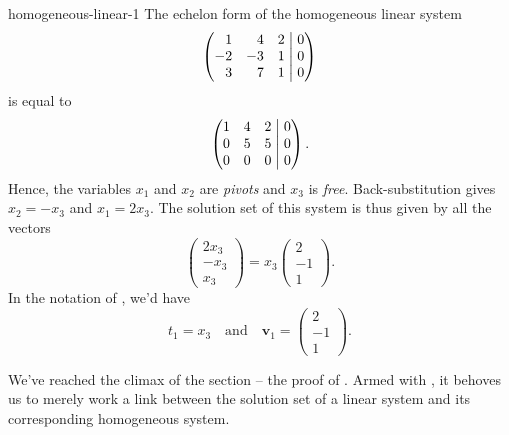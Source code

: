 \begin{example}{}{homogeneous-linear-1}
 The echelon form of the homogeneous linear system
 \[
  \left(
   \begin{matrix*}[r]
    1 & 4 & 2\\
    -2 & -3 & 1\\
    3 & 7 & 1
   \end{matrix*}
   \hspace{1mm}
  \right|
  \left.
   \begin{matrix*}[r]
    0\\
    0\\
    0
   \end{matrix*}
  \right)
 \]
 is equal to
 \[
  \left(
   \begin{matrix*}[r]
    1 & 4 & 2\\
    0 & 5 & 5\\
    0 & 0 & 0
   \end{matrix*}
   \hspace{1mm}
  \right|
  \left.
   \begin{matrix*}[r]
    0\\
    0\\
    0
   \end{matrix*}
  \right).
 \]
 Hence, the variables $x_1$ and $x_2$ are \emph{pivots} and $x_3$ is
 \emph{free}. Back-substitution gives $x_2 = -x_3$ and $x_1 = 2x_3$. The
 solution set of this system is thus given by all the vectors
 \[
  \begin{pmatrix}
   2x_3\\
   -x_3\\
   x_3
  \end{pmatrix} = x_3
  \begin{pmatrix}
   2\\
   -1\\
   1
  \end{pmatrix}.
 \]
 In the notation of
 , we'd
 have
 \[
  t_1 = x_3 \quad \text{and} \quad \mathbf{v}_1 =
  \begin{pmatrix}
   2\\
   -1\\
   1
  \end{pmatrix}.
 \]
\end{example}

We've reached the climax of the section -- the proof of
. Armed with
, it
behoves us to merely work a link between the solution set of a linear system and
its corresponding homogeneous system.

